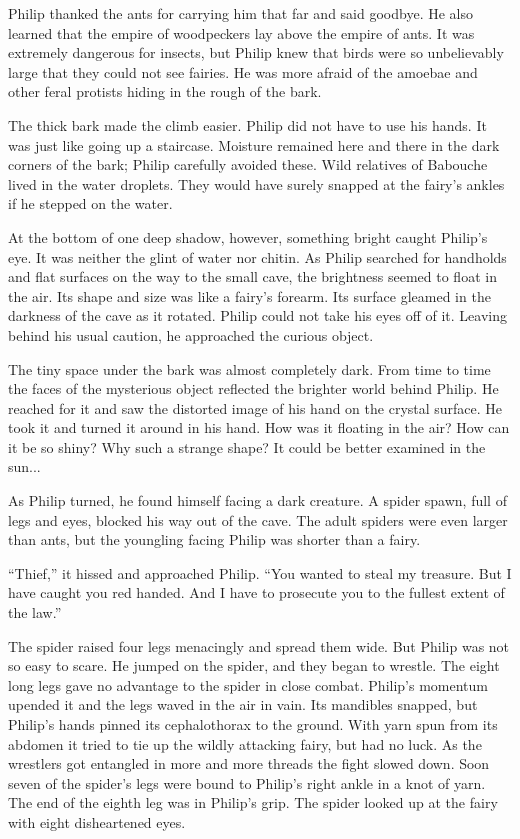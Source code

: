 \documentclass[10pt, draft]{memoir}
\begin{document}
Philip thanked the ants for carrying him that far and said goodbye. He also learned that the empire of woodpeckers lay above the empire of ants. It was extremely dangerous for insects, but Philip knew that birds were so unbelievably large that they could not see fairies. He was more afraid of the amoebae and other feral protists hiding in the rough of the bark.

The thick bark made the climb easier. Philip did not have to use his hands. It was just like going up a staircase. Moisture remained here and there in the dark corners of the bark; Philip carefully avoided these. Wild relatives of Babouche lived in the water droplets. They would have surely snapped at the fairy's ankles if he stepped on the water.

At the bottom of one deep shadow, however, something bright caught Philip's eye. It was neither the glint of water nor chitin. As Philip searched for handholds and flat surfaces on the way to the small cave, the brightness seemed to float in the air. Its shape and size was like a fairy's forearm. Its surface gleamed in the darkness of the cave as it rotated. Philip could not take his eyes off of it. Leaving behind his usual caution, he approached the curious object.

The tiny space under the bark was almost completely dark. From time to time the faces of the mysterious object reflected the brighter world behind Philip. He reached for it and saw the distorted image of his hand on the crystal surface. He took it and turned it around in his hand. How was it floating in the air? How can it be so shiny? Why such a strange shape? It could be better examined in the sun...

As Philip turned, he found himself facing a dark creature. A spider spawn, full of legs and eyes, blocked his way out of the cave. The adult spiders were even larger than ants, but the youngling facing Philip was shorter than a fairy.

``Thief,'' it hissed and approached Philip. ``You wanted to steal my treasure. But I have caught you red handed. And I have to prosecute you to the fullest extent of the law.''

The spider raised four legs menacingly and spread them wide. But Philip was not so easy to scare. He jumped on the spider, and they began to wrestle. The eight long legs gave no advantage to the spider in close combat. Philip's momentum upended it and the legs waved in the air in vain. Its mandibles snapped, but Philip’s hands pinned its cephalothorax to the ground. With yarn spun from its abdomen it tried to tie up the wildly attacking fairy, but had no luck. As the wrestlers got entangled in more and more threads the fight slowed down. Soon seven of the spider's legs were bound to Philip's right ankle in a knot of yarn. The end of the eighth leg was in Philip's grip. The spider looked up at the fairy with eight disheartened eyes.
\end{document}
